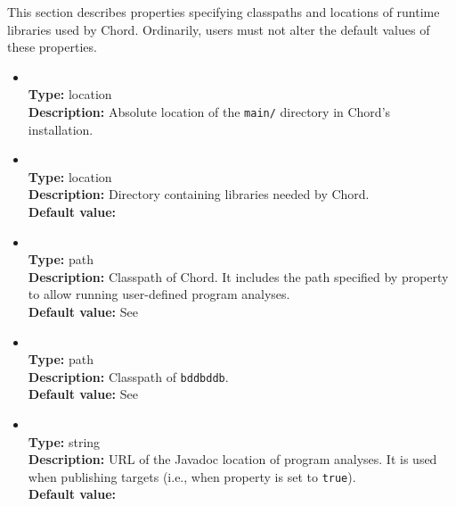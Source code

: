 This section describes properties specifying classpaths and locations of runtime libraries used by Chord.
Ordinarily, users must not alter the default values of these properties.

\begin{itemize}
\item
{} \\
{\bf Type:} location \\
{\bf Description:} Absolute location of the {\tt main/} directory in Chord's installation.

\item
{} \\
{\bf Type:} location \\
{\bf Description:} Directory containing libraries needed by Chord. \\
{\bf Default value:} 

\item
{} \\
{\bf Type:} path \\
{\bf Description:} Classpath of Chord.  It includes the path specified by property  to allow running user-defined program analyses. \\
{\bf Default value:} See  

\item
{} \\
{\bf Type:} path \\
{\bf Description:} Classpath of {\tt bddbddb}. \\
{\bf Default value:} See  

\item
{} \\
{\bf Type:} string \\
{\bf Description:} URL of the Javadoc location of program analyses.  It is used when publishing targets (i.e., when property  is set to {\tt true}). \\
{\bf Default value:} 
\end{itemize}

